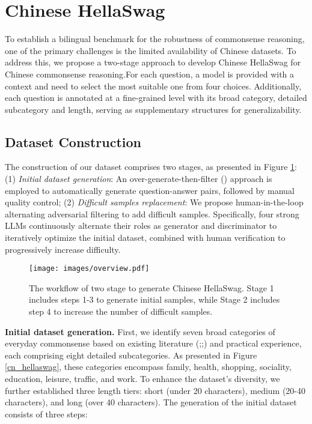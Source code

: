 \section{Chinese HellaSwag} \label{sec:chinese_hellaswag}
To establish a bilingual benchmark for the robustness of commonsense reasoning, one of the primary challenges is the limited availability of Chinese datasets. To address this, we propose a two-stage approach to develop Chinese HellaSwag for Chinese commonsense reasoning.For each question, a model is provided with a context and need to select the most suitable one from four choices. Additionally, each question is annotated at a fine-grained level with its broad category, detailed subcategory and length, serving as supplementary structures for generalizability.


\subsection{Dataset Construction}
The construction of our dataset comprises two stages, as presented in Figure \ref{overview}: 
(1) \textit{Initial dataset generation}: An over-generate-then-filter (\citealp{yuan2023distilling}) approach is employed to automatically generate question-answer pairs, followed by manual quality control; 
(2) \textit{Difficult samples replacement}: We propose human-in-the-loop alternating adversarial filtering to add difficult samples. Specifically, four strong LLMs continuously alternate their roles as generator and discriminator to iteratively optimize the initial dataset, combined with human verification to progressively increase difficulty.


\begin{figure}[t]   
\centering
\setlength{\abovecaptionskip}{0.1cm}
\setlength{\belowcaptionskip}{0cm}
\texttt{[image: images/overview.pdf]}

\caption{The workflow of two stage to generate Chinese HellaSwag. Stage 1 includes steps 1-3 to generate initial samples, while Stage 2 includes step 4 to increase the number of difficult samples.}
\label{overview}
\end{figure}

\textbf{Initial dataset generation.} First, we identify seven broad categories of everyday commonsense based on existing literature (\citealp{zellers2019hellaswag};\citealp{koupaee2018wikihow};\citealp{caba2015activitynet}) and practical experience, each comprising eight detailed subcategories. As presented in Figure \ref{cn_hellaswag}, these categories encompass family, health, shopping, sociality, education, leisure, traffic, and work. To enhance the dataset's diversity, we further established three length tiers: short (under 20 characters), medium (20-40 characters), and long (over 40 characters).
The generation of the initial dataset consists of three steps:


